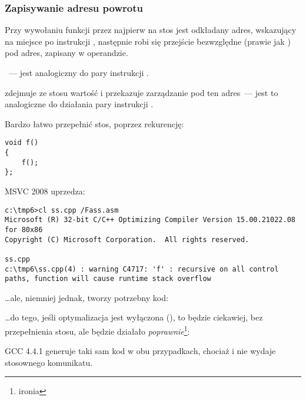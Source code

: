 \subsubsection{Zapisywanie adresu powrotu}


Przy wywołaniu funkcji przez \CALL najpierw na stos jest odkładany adres, wskazujący na miejsce po 
instrukcji \CALL, następnie robi się przejście bezwzględne (prawie jak ) pod adres, zapisany w operandzie.

\CALL~--- jest analogiczny do pary instrukcji .

\RET zdejmuje ze stosu wartość i przekazuje zarządzanie pod ten adres~--- 
jest to analogiczne do działania pary instrukcji .

\myindex{\Stack!\MLStackOverflow}
\myindex{\Recursion}
Bardzo łatwo przepełnić stos, poprzez rekurencję:

\begin{lstlisting}[style=customc]
void f()
{
	f();
};
\end{lstlisting}

MSVC 2008 uprzedza:

\begin{lstlisting}
c:\tmp6>cl ss.cpp /Fass.asm
Microsoft (R) 32-bit C/C++ Optimizing Compiler Version 15.00.21022.08 for 80x86
Copyright (C) Microsoft Corporation.  All rights reserved.

ss.cpp
c:\tmp6\ss.cpp(4) : warning C4717: 'f' : recursive on all control paths, function will cause runtime stack overflow
\end{lstlisting}

\dots ale, niemniej jednak, tworzy potrzebny kod:



\dots do tego, jeśli optymalizacja jest wyłączona (\TT{\Ox}), to będzie ciekawiej, bez przepełnienia stosu, 
ale będzie działało \emph{poprawnie}\footnote{ironia}:



GCC 4.4.1 generuje taki sam kod w obu przypadkach, chociaż i nie wydaje stosownego komunikatu.


